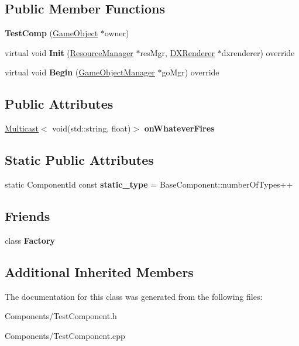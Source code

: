 \subsection*{Public Member Functions}
\begin{DoxyCompactItemize}
\item 
\mbox{\label{classTestComp_a19ad97466e2b3f489e24fdb274b3d3fc}} 
{\bfseries Test\+Comp} (\hyperlink{classGameObject}{Game\+Object} $\ast$owner)
\item 
\mbox{\label{classTestComp_ab0a4222a9460892b8dddd358d2220c22}} 
virtual void {\bfseries Init} (\hyperlink{classResourceManager}{Resource\+Manager} $\ast$res\+Mgr, \hyperlink{classDXRenderer}{D\+X\+Renderer} $\ast$dxrenderer) override
\item 
\mbox{\label{classTestComp_a3acda72ee2bf4b9b3e57972fa1a11ca9}} 
virtual void {\bfseries Begin} (\hyperlink{classGameObjectManager}{Game\+Object\+Manager} $\ast$go\+Mgr) override
\end{DoxyCompactItemize}
\subsection*{Public Attributes}
\begin{DoxyCompactItemize}
\item 
\mbox{\label{classTestComp_a5baf20d3388f491c5a0732beb28f9de1}} 
\hyperlink{classMulticast}{Multicast}$<$ void(std\+::string, float)$>$ {\bfseries on\+Whatever\+Fires}
\end{DoxyCompactItemize}
\subsection*{Static Public Attributes}
\begin{DoxyCompactItemize}
\item 
\mbox{\label{classTestComp_a27e6134e1cf660d18254064447727744}} 
static Component\+Id const {\bfseries static\+\_\+type} = Base\+Component\+::number\+Of\+Types++
\end{DoxyCompactItemize}
\subsection*{Friends}
\begin{DoxyCompactItemize}
\item 
\mbox{\label{classTestComp_a328c093d609680cca505905c6d49901a}} 
class {\bfseries Factory}
\end{DoxyCompactItemize}
\subsection*{Additional Inherited Members}


The documentation for this class was generated from the following files\+:\begin{DoxyCompactItemize}
\item 
Components/Test\+Component.\+h\item 
Components/Test\+Component.\+cpp\end{DoxyCompactItemize}
